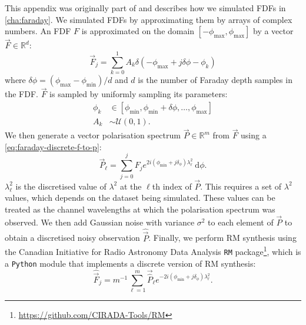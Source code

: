   This appendix was originally part of \citet{alger2021interpretable} and describes how we simulated FDFs in \autoref{cha:faraday}. We simulated FDFs by approximating them by arrays of complex numbers. An FDF $F$ is approximated on the domain $[-\phi_{\max}, \phi_{\max}]$ by a vector $\vec F \in \mathbb R^d$:
    \begin{equation}
      \label{eq:faraday-vec-f}
      \vec F_j = \sum_{k = 0}^1 A_k \delta(-\phi_{\max} + j \delta \phi - \phi_k)
    \end{equation}
    where $\delta\phi = (\phi_{\max} - \phi_{\min}) / d$ and $d$ is the number of Faraday depth samples in the FDF.
    $\vec F$ is sampled by uniformly sampling its parameters:
    \begin{align}
      \label{eq:faraday-model-distributions}
      \phi_k &\in [\phi_{\min}, \phi_{\min} + \delta\phi, \dots, \phi_{\max}]\\
      A_k &\sim \mathcal U(0, 1).
    \end{align}
    We then generate a vector polarisation spectrum $\vec P \in \mathbb R^m$ from $\vec F$ using a \autoref{eq:faraday-discrete-f-to-p}:
    \begin{equation}
      \label{eq:faraday-discrete-f-to-p}
      \vec P_\ell = \sum_{j = 0}^{j} F_j e^{2i(\phi_{\min} + j\delta_\phi)\lambda^2_\ell}\ \mathrm{d}\phi.
    \end{equation}
    $\lambda^2_\ell$ is the discretised value of $\lambda^2$ at the $\ell$th index of $\vec P$. This requires a set of $\lambda^2$ values, which depends on the dataset being simulated. These values can be treated as the channel wavelengths at which the polarisation spectrum was observed. We then add Gaussian noise with variance $\sigma^2$ to each element of $\vec P$ to obtain a discretised noisy observation $\hat{\vec{P}}$. Finally, we perform RM synthesis using the Canadian Initiative for Radio Astronomy Data Analysis \texttt{RM} package\footnote{\url{https://github.com/CIRADA-Tools/RM}}, which is a \texttt{Python} module that implements a discrete version of RM synthesis:
    \begin{equation}
      \label{eq:faraday-discrete-rm-synthesis}
      \hat{\vec{F}}_j = m^{-1} \sum_{\ell = 1}^m \vec{\hat P}_\ell e^{-2i(\phi_{\min} + j\delta_\phi)\lambda^2_\ell}.
    \end{equation}